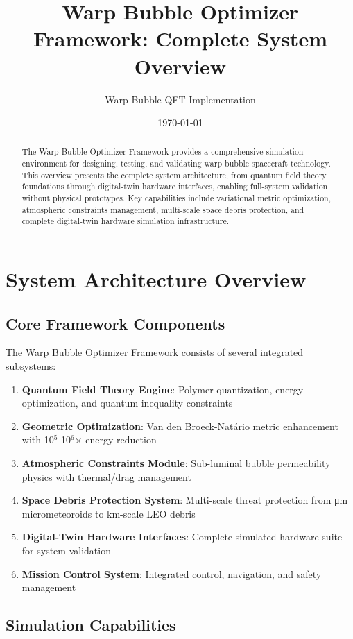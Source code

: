 \documentclass[11pt]{article}
\title{Warp Bubble Optimizer Framework: Complete System Overview}
\author{Warp Bubble QFT Implementation}
\date{\today}
\begin{document}
\maketitle

\begin{abstract}
The Warp Bubble Optimizer Framework provides a comprehensive simulation environment for designing, testing, and validating warp bubble spacecraft technology. This overview presents the complete system architecture, from quantum field theory foundations through digital-twin hardware interfaces, enabling full-system validation without physical prototypes. Key capabilities include variational metric optimization, atmospheric constraints management, multi-scale space debris protection, and complete digital-twin hardware simulation infrastructure.
\end{abstract}

\section{System Architecture Overview}

\subsection{Core Framework Components}

The Warp Bubble Optimizer Framework consists of several integrated subsystems:

\begin{enumerate}
\item \textbf{Quantum Field Theory Engine}: Polymer quantization, energy optimization, and quantum inequality constraints
\item \textbf{Geometric Optimization}: Van den Broeck-Natário metric enhancement with 10$^5$-10$^6$× energy reduction
\item \textbf{Atmospheric Constraints Module}: Sub-luminal bubble permeability physics with thermal/drag management
\item \textbf{Space Debris Protection System}: Multi-scale threat protection from μm micrometeoroids to km-scale LEO debris
\item \textbf{Digital-Twin Hardware Interfaces}: Complete simulated hardware suite for system validation
\item \textbf{Mission Control System}: Integrated control, navigation, and safety management
\end{enumerate}

\subsection{Simulation Capabilities}
\end{document}
